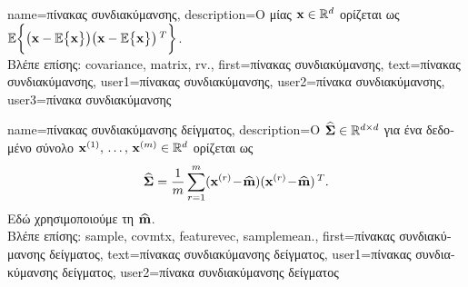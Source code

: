 {name={\foreignlanguage{greek}{πίνακας συνδιακύμανσης}}, 
	description={\foreignlanguage{greek}{Ο} 
		  \foreignlanguage{greek}{μίας}  ${\bf x} \in \mathbb{R}^{d}$ 
		\foreignlanguage{greek}{ορίζεται ως} $\mathbb{E} \bigg \{ \big( {\bf x} - \mathbb{E} \big\{ {\bf x} \big\} \big)  \big({\bf x} - \mathbb{E} \big\{ {\bf x} \big\} \big)\,^{T} \bigg\}$.\\
		\foreignlanguage{greek}{Βλέπε επίσης:} \gls{covariance}, \gls{matrix}, \gls{rv}.},
	first={\foreignlanguage{greek}{πίνακας συνδιακύμανσης}},
	text={\foreignlanguage{greek}{πίνακας συνδιακύμανσης}},
	user1={\foreignlanguage{greek}{πίνακας συνδιακύμανσης}}, %
  	user2={\foreignlanguage{greek}{πίνακα συνδιακύμανσης}}, %
	user3={\foreignlanguage{greek}{πίνακα συνδιακύμανσης}} %
}

{name={\foreignlanguage{greek}{πίνακας συνδιακύμανσης δείγματος}}, 
	description={\foreignlanguage{greek}{Ο} 
		  $\widehat{\bf \Sigma} \in \mathbb{R}^{d \times d}$ 
		\foreignlanguage{greek}{για ένα δεδομένο σύνολο}  
		${\bf x}^{(1)}, \,\ldots, \,{\bf x}^{(m)} \in \mathbb{R}^{d}$ \foreignlanguage{greek}{ορίζεται ως}  
		$$\widehat{\bf \Sigma} = \frac{1}{m} \sum_{r=1}^{m} ({\bf x}^{(r)}\!-\!\widehat{{\bf m}}) ({\bf x}^{(r)}\!-\!\widehat{{\bf m}})\,^{T}.$$ 
		\foreignlanguage{greek}{Εδώ χρησιμοποιούμε τη}  $\widehat{{\bf m}}$.\\
		\foreignlanguage{greek}{Βλέπε επίσης:} \gls{sample}, \gls{covmtx}, \gls{featurevec}, \gls{samplemean}.},
	first={\foreignlanguage{greek}{πίνακας συνδιακύμανσης δείγματος}},
	text={\foreignlanguage{greek}{πίνακας συνδιακύμανσης δείγματος}},
	user1={\foreignlanguage{greek}{πίνακας συνδιακύμανσης δείγματος}}, %
	user2={\foreignlanguage{greek}{πίνακα συνδιακύμανσης δείγματος}} %
}


